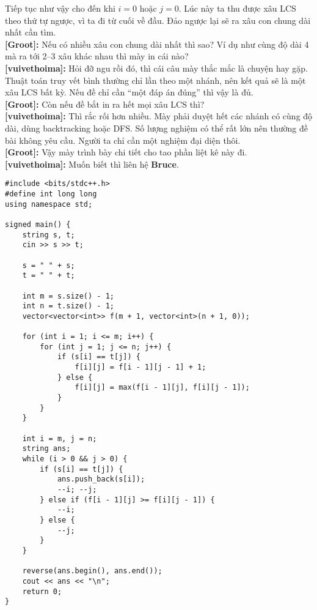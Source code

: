Tiếp tục như vậy cho đến khi $i=0$ hoặc $j=0$.  
Lúc này ta thu được xâu LCS theo thứ tự ngược, vì ta đi từ cuối về đầu.  
Đảo ngược lại sẽ ra xâu con chung dài nhất cần tìm.\\

\textbf{[Groot]:} Nếu có nhiều xâu con chung dài nhất thì sao? Ví dụ như cùng độ dài 4 mà ra tới 2–3 xâu khác nhau thì mày in cái nào?\\

\textbf{[vuivethoima]:} Hỏi đỡ ngu rồi đó, thì cái câu mày thắc mắc là chuyện hay gặp. Thuật toán truy vết bình thường chỉ lần theo một nhánh, nên kết quả sẽ là một xâu LCS bất kỳ. 
Nếu đề chỉ cần ``một đáp án đúng'' thì vậy là đủ.\\

\textbf{[Groot]:} Còn nếu đề bắt in ra hết mọi xâu LCS thì?\\

\textbf{[vuivethoima]:} Thì rắc rối hơn nhiều. Mày phải duyệt hết các nhánh có cùng độ dài, dùng backtracking hoặc DFS. 
Số lượng nghiệm có thể rất lớn nên thường đề bài không yêu cầu. 
Người ta chỉ cần một nghiệm đại diện thôi.\\

\textbf{[Groot]:} Vậy mày trình bày chi tiết cho tao phần liệt kê này đi. \\

\textbf{[vuivethoima]:} Muốn biết thì liên hệ \textbf{Bruce}.

\begin{lstlisting}[title=\centering \textbf{Cài đặt}]
#include <bits/stdc++.h>
#define int long long
using namespace std;

signed main() {
    string s, t;
    cin >> s >> t;

    s = " " + s;
    t = " " + t;

    int m = s.size() - 1;
    int n = t.size() - 1;
    vector<vector<int>> f(m + 1, vector<int>(n + 1, 0));

    for (int i = 1; i <= m; i++) {
        for (int j = 1; j <= n; j++) {
            if (s[i] == t[j]) {
                f[i][j] = f[i - 1][j - 1] + 1;
            } else {
                f[i][j] = max(f[i - 1][j], f[i][j - 1]);
            }
        }
    }

    int i = m, j = n;
    string ans;
    while (i > 0 && j > 0) {
        if (s[i] == t[j]) {
            ans.push_back(s[i]);
            --i; --j;
        } else if (f[i - 1][j] >= f[i][j - 1]) {
            --i;
        } else {
            --j;
        }
    }

    reverse(ans.begin(), ans.end());
    cout << ans << "\n";
    return 0;
}
\end{lstlisting}


